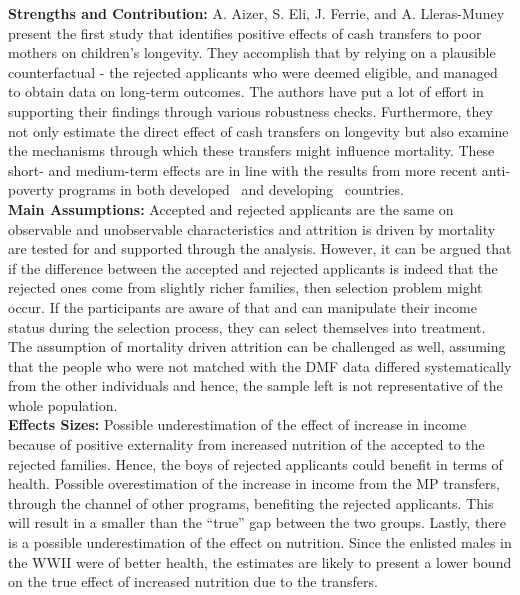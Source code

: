 \textbf{Strengths and Contribution:} A. Aizer, S. Eli, J. Ferrie, and A. Lleras-Muney present the first study that identifies positive effects of cash transfers to poor mothers on children's longevity. They accomplish that by relying on a plausible counterfactual - the rejected applicants who were deemed eligible, and managed to obtain data on long-term outcomes. The authors have put a lot of effort in supporting their findings through various robustness checks. Furthermore, they not only estimate the direct effect of cash transfers on longevity but also examine the mechanisms through which these transfers might influence mortality. These short- and medium-term effects are in line with the results from more recent anti-poverty programs in both developed~\citep{almond2011inside,hoynes2016long,dahl2012impact,milligan2011child} and developing~\citep{barham2011healthier,barham2013living} countries. \\
\textbf{Main Assumptions:} Accepted and rejected applicants are the same on observable and unobservable characteristics and attrition is driven by mortality are tested for and supported through the analysis. However, it can be argued that if the difference between the accepted and rejected applicants is indeed that the rejected ones come from slightly richer families, then selection problem might occur. If the participants are aware of that and can manipulate their income status during the selection process, they can select themselves into treatment. The assumption of mortality driven attrition can be challenged as well, assuming that the people who were not matched with the DMF data differed systematically from the other individuals and hence, the sample left is not representative of the whole population. \\
\textbf{Effects Sizes:} Possible underestimation of the effect of increase in income because of positive
externality from increased nutrition of the accepted to the rejected families. Hence, the boys of rejected applicants could benefit in terms of health. Possible overestimation of the increase in income from the MP transfers, through the channel of other programs, benefiting the rejected applicants. This will result in a smaller than the ``true'' gap between the two groups. Lastly, there is a possible underestimation of the effect on nutrition. Since the enlisted males in the WWII were of better health, the estimates are likely to present a lower bound on the true effect of increased nutrition due to the transfers. \\
